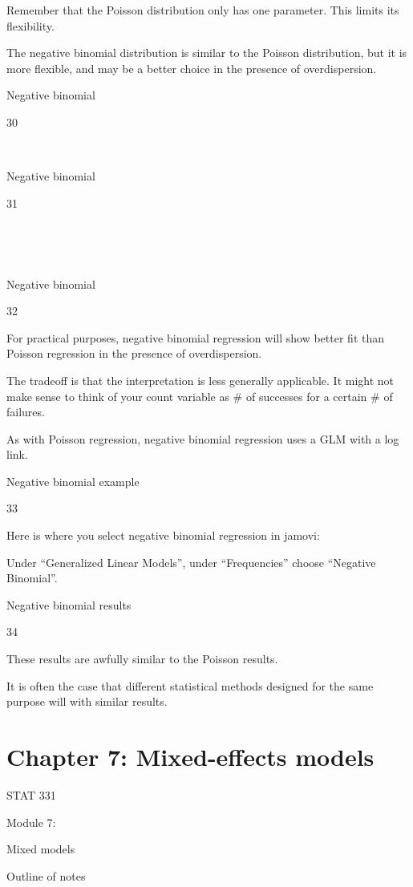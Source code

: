 \documentclass[
  letterpaper,
  DIV=11,
  numbers=noendperiod]{scrreprt}
\begin{document}
Remember that the Poisson distribution only has one parameter. This
limits its flexibility.

The negative binomial distribution is similar to the Poisson
distribution, but it is more flexible, and may be a better choice in the
presence of overdispersion.

Negative binomial

30

~

Negative binomial

31

~

~

Negative binomial

32

For practical purposes, negative binomial regression will show better
fit than Poisson regression in the presence of overdispersion.

The tradeoff is that the interpretation is less generally applicable. It
might not make sense to think of your count variable as \# of successes
for a certain \# of failures.

As with Poisson regression, negative binomial regression uses a GLM with
a log link.

Negative binomial example

33

Here is where you select negative binomial regression in jamovi:

Under ``Generalized Linear Models'', under ``Frequencies'' choose
``Negative Binomial''.

Negative binomial results

34

These results are awfully similar to the Poisson results.

It is often the case that different statistical methods designed for the
same purpose will with similar results.


\hypertarget{chapter-7-mixed-effects-models}{%
\chapter{Chapter 7: Mixed-effects
models}\label{chapter-7-mixed-effects-models}}

STAT 331

Module 7:

Mixed models

Outline of notes
\end{document}
